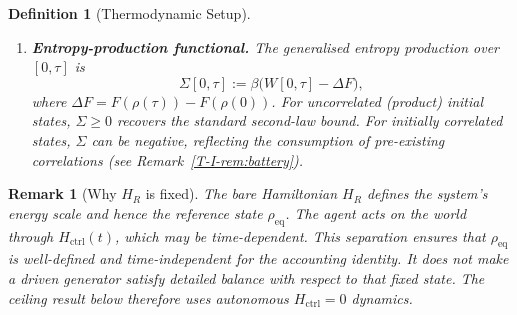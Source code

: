 \documentclass[12pt,a4paper,openany]{book}
\newtheorem{definition}[theorem]{Definition}
\newtheorem{remark}[theorem]{Remark}
\begin{document}
\begin{definition}[Thermodynamic Setup]
\begin{enumerate}
\item \textbf{Entropy-production functional.}
  The \emph{generalised entropy production} over $[0,\tau]$ is
  \begin{equation}
  \label{T-I-eq:Sigma}
  \Sigma[0,\tau] := \beta\bigl(W[0,\tau] - \Delta F\bigr),
  \end{equation}
  where $\Delta F = F(\rho(\tau)) - F(\rho(0))$.
  For uncorrelated (product) initial states,
  $\Sigma \geq 0$ recovers the standard second-law bound.
  For initially correlated states, $\Sigma$ can be
  \emph{negative}, reflecting the consumption of
  pre-existing correlations
  (see Remark~\ref{T-I-rem:battery}).
\end{enumerate}
\end{definition}

\begin{remark}[Why $H_R$ is fixed]
\label{T-I-rem:H_fixed}
The bare Hamiltonian $H_R$ defines the system's energy scale and
hence the reference state $\rho_{\mathrm{eq}}$.
The agent acts on the world through $H_{\mathrm{ctrl}}(t)$,
which may be time-dependent.
This separation ensures that $\rho_{\mathrm{eq}}$ is
well-defined and time-independent for the accounting identity.
It does \emph{not} make a driven generator satisfy detailed balance
with respect to that fixed state.  The ceiling result below therefore
uses autonomous $H_{\mathrm{ctrl}}=0$ dynamics.
\end{remark}
\end{document}
